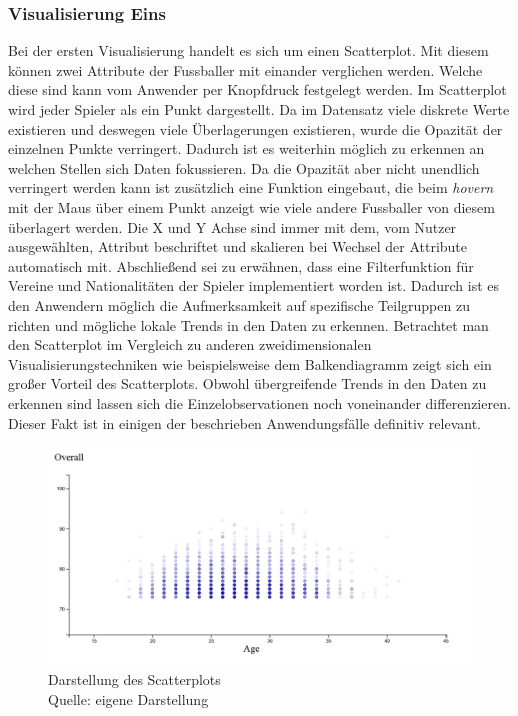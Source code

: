 \documentclass[usegeometry=true]{scrartcl}
\begin{document}
\subsubsection{Visualisierung Eins}
Bei der ersten Visualisierung handelt es sich um einen Scatterplot.
Mit diesem können zwei Attribute der Fussballer mit einander verglichen werden. Welche diese sind kann vom Anwender per Knopfdruck festgelegt werden. Im Scatterplot wird jeder Spieler als ein Punkt dargestellt. Da im Datensatz viele diskrete Werte existieren und deswegen viele Überlagerungen existieren, wurde die Opazität der einzelnen Punkte verringert. Dadurch ist es weiterhin möglich zu erkennen an welchen Stellen sich Daten fokussieren. Da die Opazität aber nicht unendlich verringert werden kann ist zusätzlich eine Funktion eingebaut, die beim \textit{hovern} mit der Maus über einem Punkt anzeigt wie viele andere Fussballer von diesem überlagert werden.
Die X und Y Achse sind immer mit dem, vom Nutzer ausgewählten, Attribut beschriftet und skalieren bei Wechsel der Attribute automatisch mit.
Abschließend sei zu erwähnen, dass eine Filterfunktion für Vereine und Nationalitäten der Spieler implementiert worden ist. Dadurch ist es den Anwendern möglich die Aufmerksamkeit auf spezifische Teilgruppen zu richten und mögliche lokale Trends in den Daten zu erkennen.
Betrachtet man den Scatterplot im Vergleich zu anderen zweidimensionalen Visualisierungstechniken wie beispielsweise dem Balkendiagramm zeigt sich ein großer Vorteil des Scatterplots. Obwohl übergreifende Trends in den Daten zu erkennen sind lassen sich die Einzelobservationen noch voneinander differenzieren. Dieser Fakt ist in einigen der beschrieben Anwendungsfälle definitiv relevant.
\begin{figure}[h!]
\centering
\includegraphics[scale=0.4]{grafiken/Scatterplot1}
\caption{Darstellung des Scatterplots\\ Quelle: eigene Darstellung}
\label{SP}
\end{figure}
\end{document}
